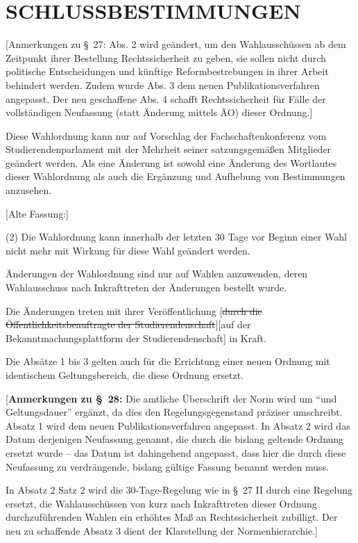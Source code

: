 \documentclass[%
draft,%
multilinesections%
]{fswo}
\newcommand\oldT[1]  {{\color{Gray}[\st{#1}]}}
\newcommand\newT[1]  {{\color{Green}[#1]}}
\newcommand\bemFr[1] {{\color{Red}[#1]}}
\newcommand\bemFe[1] {{\color{Cyan}[#1]}}
\newcommand\remark[1]{\begin{addmargin}{1cm}#1\end{addmargin}}
\newcommand\oldT[1]{}%
\newcommand\newT[1]{#1}
\newcommand\bemFr[1]{}%
\newcommand\bemFe[1]{}%
\newcommand\remark[1]{}
\newcommand\change[2]{\oldT{#1}\newT{#2}}
\begin{document}
\section{SCHLUSSBESTIMMUNGEN}
\bemFr{Anmerkungen zu \S~27: Abs. 2 wird geändert, um den Wahlausschüssen ab dem Zeitpunkt ihrer Bestellung Rechtssicherheit zu geben, sie sollen nicht durch politische Entscheidungen und künftige Reformbestrebungen in ihrer Arbeit behindert werden.
Zudem wurde Abs. 3 dem neuen Publikationsverfahren angepasst. Der neu geschaffene Abs. 4 schafft Rechtssicherheit für Fälle der vollständigen Neufassung (statt Änderung mittels ÄO) dieser Ordnung.}

\begin{contract}
Diese Wahlordnung kann nur auf Vorschlag der Fachschaftenkonferenz vom Studierendenparlament mit der Mehrheit seiner satzungsgemäßen Mitglieder geändert werden.
Als eine Änderung ist sowohl eine Änderung des Wortlautes dieser Wahlordnung als auch die Ergänzung und Aufhebung von Bestimmungen anzusehen.

\remark{%
\bemFe{Alte Fassung:}

\color{Gray}
(2) Die Wahlordnung kann innerhalb der letzten 30 Tage vor Beginn einer Wahl nicht mehr mit Wirkung für diese Wahl geändert werden.}

Änderungen der Wahlordnung sind nur auf Wahlen anzuwenden, deren Wahlausschuss nach Inkrafttreten der Änderungen bestellt wurde.

Die Änderungen treten mit ihrer Veröffentlichung
\change{durch die Öffentlichkeitsbeauftragte der Studierendenschaft}{auf der Bekanntmachungsplattform der Studierendenschaft} in Kraft.

Die Absätze 1 bis 3 gelten auch für die Errichtung einer neuen Ordnung mit identischem Geltungsbereich, die diese Ordnung ersetzt.
\end{contract}

\bemFr{\textbf{Anmerkungen zu \S~28:}
Die amtliche Überschrift der Norm wird um \enquote{und Geltungsdauer} ergänzt, da dies den Regelungsgegenstand präziser umschreibt.
Absatz 1 wird dem neuen Publikationsverfahren angepasst.
In Absatz 2 wird das Datum derjenigen Neufassung genannt, die durch die bislang geltende Ordnung ersetzt wurde –
das Datum ist dahingehend angepasst, dass hier die durch diese Neufassung zu verdrängende, bislang gültige Fassung benannt werden muss.

In Absatz 2 Satz 2 wird die 30-Tage-Regelung wie in \S~27 II durch eine Regelung ersetzt, die Wahlausschüssen von kurz nach Inkrafttreten dieser Ordnung durchzuführenden Wahlen ein erhöhtes Maß an Rechtssicherheit zubilligt. Der neu zu schaffende Absatz 3 dient der Klarstellung der Normenhierarchie.}
\end{document}
